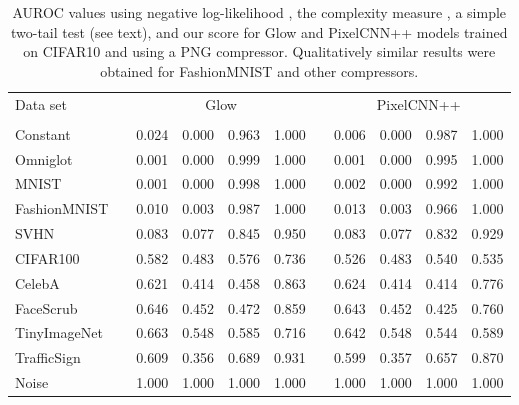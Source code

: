 \documentclass[letterpaper]{article} \usepackage{iclr2020_conference,times}
\begin{document}
\begin{table}[t]
\caption{AUROC values using negative log-likelihood , the complexity measure , a simple two-tail test  (see text), and our score  for Glow and PixelCNN++ models trained on CIFAR10 and using a PNG compressor. Qualitatively similar results were obtained for FashionMNIST and other compressors.}
\label{tab:badones}
\begin{center}
\setlength\tabcolsep{7pt}
\begin{tabular}{lcccccccccc}
\hline
Data set        & & \multicolumn{4}{c}{Glow}    & & \multicolumn{4}{c}{PixelCNN++}  \\
\cline{3-6}\cline{8-11}
                & &    &        &  &  & &    &  &  &  \\
\hline
Constant        & & 0.024   & 0.000 & 0.963 & 1.000 & & 0.006   & 0.000 & 0.987 & 1.000 \\
Omniglot        & & 0.001   & 0.000 & 0.999 & 1.000 & & 0.001   & 0.000 & 0.995 & 1.000 \\
MNIST           & & 0.001   & 0.000 & 0.998 & 1.000 & & 0.002   & 0.000 & 0.992 & 1.000 \\
FashionMNIST    & & 0.010   & 0.003 & 0.987 & 1.000 & & 0.013   & 0.003 & 0.966 & 1.000 \\
SVHN            & & 0.083   & 0.077 & 0.845 & 0.950 & & 0.083   & 0.077 & 0.832 & 0.929 \\
CIFAR100        & & 0.582   & 0.483 & 0.576 & 0.736 & & 0.526   & 0.483 & 0.540 & 0.535 \\
CelebA          & & 0.621   & 0.414 & 0.458 & 0.863 & & 0.624   & 0.414 & 0.414 & 0.776 \\
FaceScrub       & & 0.646   & 0.452 & 0.472 & 0.859 & & 0.643   & 0.452 & 0.425 & 0.760 \\
TinyImageNet    & & 0.663   & 0.548 & 0.585 & 0.716 & & 0.642   & 0.548 & 0.544 & 0.589 \\
TrafficSign     & & 0.609   & 0.356 & 0.689 & 0.931 & & 0.599   & 0.357 & 0.657 & 0.870 \\
Noise           & & 1.000   & 1.000 & 1.000 & 1.000 & & 1.000   & 1.000 & 1.000 & 1.000 \\
\hline
\end{tabular}
\end{center}
\end{table}
\end{document}
